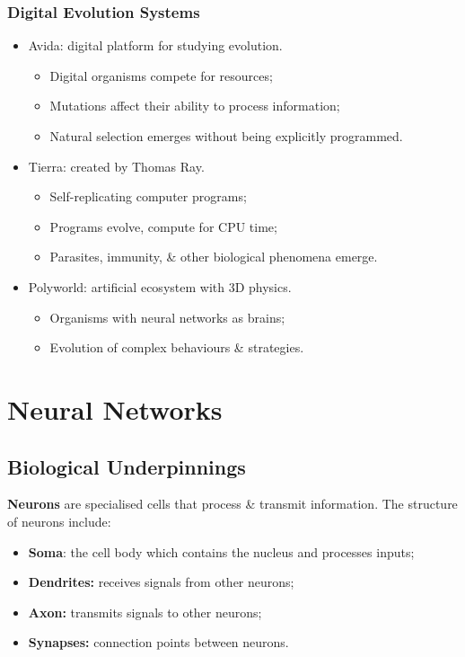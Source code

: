\documentclass[a4paper,11pt]{article}
\begin{document}
\subsubsection{Digital Evolution Systems}
\begin{itemize}
    \item   Avida: digital platform for studying evolution.
            \begin{itemize}
                \item   Digital organisms compete for resources;
                \item   Mutations affect their ability to process information;
                \item   Natural selection emerges without being explicitly programmed.
            \end{itemize}

    \item   Tierra: created by Thomas Ray.
            \begin{itemize}
                \item   Self-replicating computer programs;
                \item   Programs evolve, compute for CPU time;
                \item   Parasites, immunity, \&  other biological phenomena emerge.
            \end{itemize}

    \item   Polyworld: artificial ecosystem with 3D physics.
            \begin{itemize}
                \item   Organisms with neural networks as brains;
                \item   Evolution of complex behaviours \& strategies.
            \end{itemize}
\end{itemize}

\section{Neural Networks}
\subsection{Biological Underpinnings}
\textbf{Neurons} are specialised cells that process \& transmit information.
The structure of neurons include:
\begin{itemize}
    \item   \textbf{Soma}: the cell body which contains the nucleus and processes inputs;
    \item   \textbf{Dendrites:} receives signals from other neurons;
    \item   \textbf{Axon:} transmits signals to other neurons;
    \item   \textbf{Synapses:} connection points between neurons.
\end{itemize}
\end{document}
